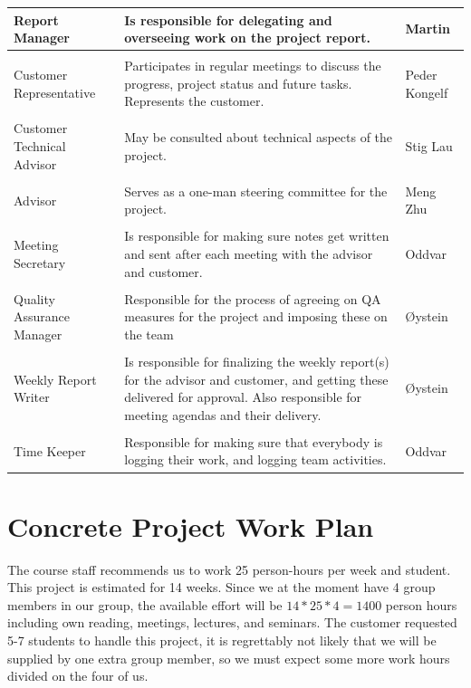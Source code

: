 \begin{table}
\begin{tabularx}{\textwidth}{ l X l }
  Report Manager & Is responsible for delegating and overseeing work on the project report. & Martin \vspace*{0.7ex} \\ 
  \hline \\ [-1.5ex]
  Customer Representative & Participates in regular meetings to discuss the progress, project status and future tasks. Represents the customer. & Peder Kongelf \vspace*{0.7ex} \\ 
  \hline \\ [-1.5ex]
  Customer Technical Advisor & May be consulted about technical aspects of the project. & Stig Lau \vspace*{0.7ex} \\ 
  \hline \\ [-1.5ex]
  Advisor & Serves as a one-man steering committee for the project. & Meng Zhu \vspace*{0.7ex} \\ 
  \hline \\ [-1.5ex]
  Meeting Secretary & Is responsible for making sure notes get written and sent after each meeting with the advisor and customer. & Oddvar \vspace*{0.7ex} \\ 
  \hline \\ [-1.5ex]
  Quality Assurance Manager & Responsible for the process of agreeing on QA measures for the project and imposing these on the team  & Øystein \vspace*{0.7ex} \\ 
  \hline \\ [-1.5ex]
  Weekly Report Writer & Is responsible for finalizing the weekly report(s) for the advisor and customer, and getting these delivered for approval. Also responsible for meeting agendas and their delivery. & Øystein \vspace*{0.7ex} \\ 
  \hline \\ [-1.5ex]
  Time Keeper & Responsible for making sure that everybody is logging their work, and logging team activities. & Oddvar \vspace*{0.7ex} \\ 
  \hline
\end{tabularx}
\label{table-teamroles}
\end{table}

\section{Concrete Project Work Plan}
The course staff recommends us to work 25 person-hours per week and student. This project is estimated for 14 weeks. Since we at the moment have 4 group members in our group, the available effort will be $14*25*4=1400$ person hours including own reading, meetings, lectures, and seminars. The customer requested 5-7 students to handle this project, it is regrettably not likely that we will be supplied by one extra group member, so we must expect some more work hours divided on the four of us.

